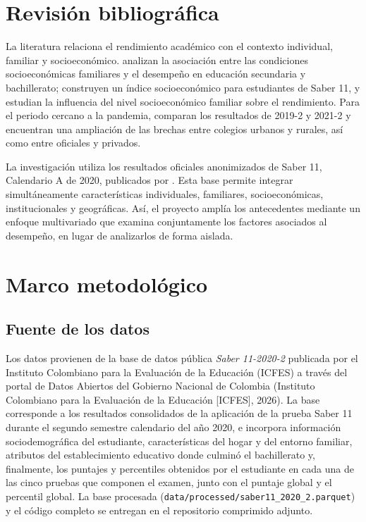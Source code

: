 \documentclass[12pt]{article}
\newcommand{\corr}[1]{\textcolor{azulcorr}{#1}}
\begin{document}
\section{Revisión bibliográfica}

La literatura relaciona el rendimiento académico con el contexto individual, familiar y
socioeconómico. \corr{\textcite{garciagil2021} analizan la asociación entre las condiciones
socioeconómicas familiares y el desempeño en educación secundaria y bachillerato};
\textcite{cruz2016} construyen un índice socioeconómico para estudiantes de Saber 11, y
\textcite{morales2024} estudian la influencia del nivel socioeconómico familiar sobre el
rendimiento. \corr{Para el periodo cercano a la pandemia, \textcite{quintero2025} comparan
los resultados de 2019-2 y 2021-2 y encuentran una ampliación de las brechas entre colegios
urbanos y rurales, así como entre oficiales y privados.}

La investigación utiliza los resultados oficiales anonimizados de Saber 11, Calendario A de
2020, publicados por \textcite{icfes2026}. Esta base permite integrar simultáneamente
características individuales, familiares, socioeconómicas, institucionales y geográficas.
Así, el proyecto amplía los antecedentes mediante un enfoque multivariado que examina
conjuntamente los factores asociados al desempeño, en lugar de analizarlos de forma aislada.

\section{Marco metodológico}

\subsection{Fuente de los datos}

Los datos provienen de la base de datos pública \textit{Saber 11-2020-2} publicada por
el Instituto Colombiano para la Evaluación de la Educación (ICFES) a través del portal
de Datos Abiertos del Gobierno Nacional de Colombia \corr{(Instituto Colombiano para la Evaluación
de la Educación [ICFES], 2026)}. La base corresponde a los resultados
consolidados de la aplicación de la prueba Saber 11 durante el segundo semestre
calendario del año 2020, e incorpora información sociodemográfica del estudiante,
características del hogar y del entorno familiar, atributos del establecimiento educativo
donde culminó el bachillerato y, finalmente, los puntajes y percentiles obtenidos
por el estudiante en cada una de las cinco pruebas que componen el examen, junto
con el puntaje global y el percentil global. \corr{La base procesada
(\texttt{data/processed/saber11\_2020\_2.parquet}) y el código completo se entregan en el
repositorio comprimido adjunto.} 
\end{document}
